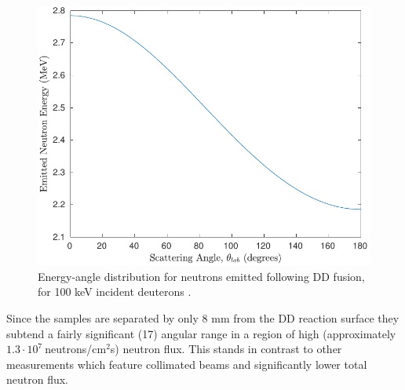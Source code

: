 \documentclass[5p]{elsarticle}
\newcommand{\sci}[2]{ #1 \cdot 10^{#2}\ }
\newcommand{\mytilde}{\raisebox{0.5ex}{\texttildelow}}
\begin{document}
\begin{figure}
 \centering
 \includegraphics[scale=0.6]{./figures/scatt_angle.pdf}
 \caption{Energy-angle distribution for neutrons emitted following DD fusion, for 100 keV incident deuterons \cite{Liskien_Paulsen_1973}.}
 \label{fig:scatt_angle}
\end{figure}

Since the samples are separated by only  8 mm from the DD reaction surface they  subtend a fairly significant  (\mytilde 17\degree)
angular range in a region of  high  (approximately $\sci{1.3}{7}$neutrons/cm$^2$s) neutron flux.
This stands in contrast to other measurements which feature collimated beams and significantly lower total neutron flux.
 




\end{document}
